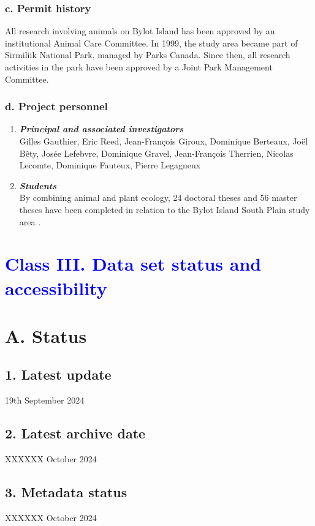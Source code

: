 \documentclass[a4paper,twoside,12pt]{article}
\begin{document}
        		\subsubsection*{c. Permit history}
      All research involving animals on Bylot Island has been approved by an institutional Animal Care Committee. In 1999, the study area became part of Sirmiliik National Park, managed by Parks Canada. Since then, all research activities in the park have been approved by a Joint Park Management Committee.
      
      		\subsubsection*{d. Project personnel}
      		\begin{enumerate}[label=\alph*.]
      			\item[] \textit{\textbf{Principal and associated investigators}}\\
      			Gilles Gauthier, Eric Reed, Jean-François Giroux, Dominique Berteaux, Joël Bêty, Josée Lefebvre, Dominique Gravel, Jean-François Therrien, Nicolas Lecomte, Dominique Fauteux, Pierre Legagneux \citep{gauthier2024b}
      			\item[] \textit{\textbf{Students}}\\
      			By combining animal and plant ecology, 24 doctoral theses and 56 master theses have been completed in relation to the Bylot Island South Plain study area \citep{gauthier2024b}.
      		\end{enumerate}
\newpage 

 \section*{\textcolor{Blue}{Class III. Data set status and accessibility}}
    \section*{A. Status}
 		\subsection*{1. Latest update} 19th September 2024
        \subsection*{2. Latest archive date} XXXXXX October 2024
        \subsection*{3. Metadata status} XXXXXX October 2024
\end{document}
